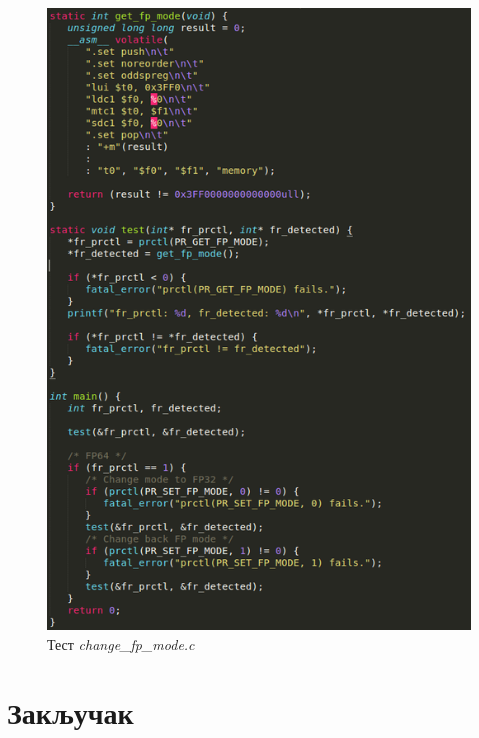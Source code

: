 \documentclass[12pt,oneside]{memoir}
\begin{document}
\begin{figure}[h!]
\begin{center}
\includegraphics[scale=0.75]{slika30.png}
\end{center}
\caption{Тест \textit{change\_fp\_mode.c}}
\label{fig:changefp}
\end{figure}

\chapter{Закључак}
\end{document}

